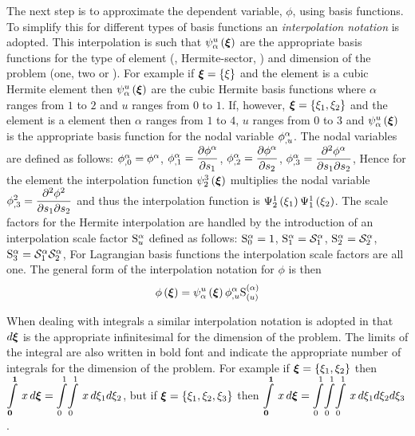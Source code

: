 The next step is to approximate the dependent variable, $\phi$, using basis
functions. To simplify this for different types of basis functions an
\emph{interpolation notation} is adopted. This
interpolation is such that $\gbfn{\alpha}{u}{\vect{\xi}}$ are the appropriate
basis functions for the type of element (\eg \bicubicherm, Hermite-sector,
\etc) and dimension of the problem (one, two or \threedal). For example if
$\vect{\xi}=\bbrac{\xi}$ and the element is a cubic Hermite element then
$\gbfn{\alpha}{u}{\vect{\xi}}$ are the cubic Hermite basis functions where
$\alpha$ ranges from $1$ to $2$ and $u$ ranges from $0$ to $1$. If, however,
$\vect{\xi}=\bbrac{\xione,\xitwo}$ and the element is a \bicubicherm element
then $\alpha$ ranges from $1$ to $4$, $u$ ranges from $0$ to $3$ and
$\gbfn{\alpha}{u}{\vect{\xi}}$ is the appropriate basis function for the nodal
variable $  {\phi}^{\alpha} _{,u} $. The nodal variables are defined as
follows: $  {\phi}^{\alpha} _{,0} = {\phi}^{\alpha} $,
$  {\phi}^{\alpha} _{,1} = \dfrac{\partial  {\phi}^{\alpha} }{\partial s_{1}} $,
$  {\phi}^{\alpha} _{,2} = \dfrac{\partial  {\phi}^{\alpha} }{\partial s_{2}} $,
$  {\phi}^{\alpha} _{,3} = \dfrac{\partial^{2}  {\phi}^{\alpha} }{\partial s_{1} \partial s_{2}} $,
\etc Hence for the \bicubicherm element the interpolation function
$\gbfn{2}{3}{\vect{\xi}}$ multiplies the nodal variable
$\phi^{2}_{,3}= \dfrac{\partial^{2} \phi^{2}}{\partial s_{1} \partial s_{2}} $ and thus the
interpolation function is $   \Psi_{2}^{1} \left( \xi_{1} \right)     \Psi_{1}^{1} \left( \xi_{2} \right)  $.  The
scale factors for the Hermite interpolation are handled by the introduction of
an interpolation scale factor $ \mathrm{S}^{\alpha}_{u} $ defined as follows:
$ \mathrm{S}^{\alpha}_{0} =1$, $ \mathrm{S}^{\alpha}_{1} = \mathcal{S}^{\alpha}_{1} $, $ \mathrm{S}^{\alpha}_{2} =
 \mathcal{S}^{\alpha}_{2} $, $ \mathrm{S}^{\alpha}_{3} = \mathcal{S}^{\alpha}_{1}  \mathcal{S}^{\alpha}_{2} $,
\etc For Lagrangian basis functions the interpolation scale factors are all
one. The general form of the interpolation notation for $\phi$ is then
\begin{equation}
  \fnof{\phi}{\vect{\xi}}=\gbfn{\alpha}{u}{\vect{\xi}}\nodedof{\phi}
  {\alpha}{u}\gsf{(\alpha)}{(u)}
  \label{eqn:phiinterpolation}
\end{equation}

When dealing with integrals a similar interpolation notation is adopted in
that $d\vect{\xi}$ is the appropriate infinitesimal for the dimension of the
problem. The limits of the integral are also written in bold font and indicate
the appropriate number of integrals for the dimension of the problem.  For
example if $\vect{\xi}=\bbrac{\xione,\xitwo}$ then
$\gint{\vect{0}}{\vect{1}}{x}
{\vect{\xi}}=\giint{0}{1}{0}{1}{x}{\xione}{\xitwo}$, but if $\vect{\xi}=
\bbrac{\xione,\xitwo,\xithree}$ then $\gint{\vect{0}}{\vect{1}}{x}
{\vect{\xi}}=\dintl{0}{1}\!\dintl{0}{1}\!\dintl{0}{1}\,x\,d\xione d\xitwo
d\xithree$.

